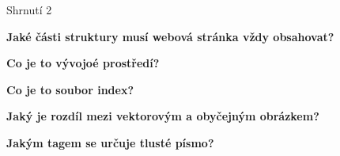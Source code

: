 \documentclass[aspectratio=169]{beamer}
\begin{document}
\begin{frame}{Shrnutí 2}
    \begin{cardTiny}
        \begin{center}
            \textbf{Jaké části struktury musí webová stránka vždy obsahovat?}
        \end{center}
    \end{cardTiny}
    \begin{cardTiny}
        \begin{center}
            \textbf{Co je to vývojoé prostředí?}
        \end{center}
    \end{cardTiny}
    \begin{cardTiny}
        \begin{center}
            \textbf{Co je to soubor index?}
        \end{center}
    \end{cardTiny}
    \begin{cardTiny}
        \begin{center}
            \textbf{Jaký je rozdíl mezi vektorovým a obyčejným obrázkem?}
        \end{center}
    \end{cardTiny}
    \begin{cardTiny}
        \begin{center}
            \textbf{Jakým tagem se určuje tlusté písmo?}
        \end{center}
    \end{cardTiny}
\end{frame}
\end{document}
